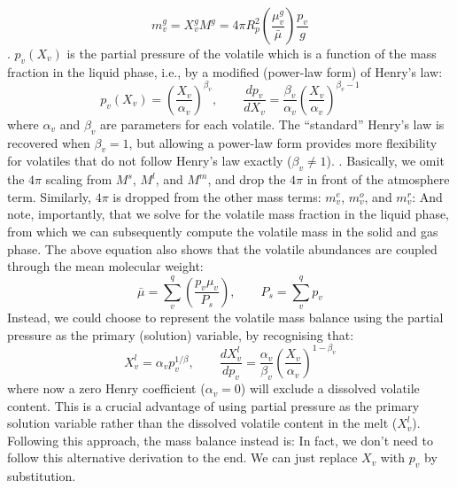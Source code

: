 \begin{equation}
m_v^g = X_v^g M^g = 4 \pi R_p^2 \left( \frac{\mu_v^g}{\bar{\mu}} \right) \frac{p_v}{g}
\end{equation}
.  $p_v(X_v)$ is the partial pressure of the volatile which is a function of the mass fraction in the liquid phase, i.e., by a modified (power-law form) of Henry's law:
\begin{equation}
p_v ( X_v ) = \left( \frac{X_v}{\alpha_v} \right)^{\beta_v}, \qquad \frac{dp_v}{d X_v} = \frac{\beta_v}{\alpha_v} \left( \frac{X_v}{\alpha_v} \right)^{\beta_v-1}
\label{eq:Henry_mod}
\end{equation}
where $\alpha_v$ and $\beta_v$ are parameters for each volatile.  The ``standard'' Henry's law is recovered when $\beta_v=1$, but allowing a power-law form provides more flexibility for volatiles that do not follow Henry's law exactly ($\beta_v \neq 1$).  .  Basically, we omit the $4 \pi$ scaling from $M^s$, $M^l$, and $M^m$, and drop the $4 \pi$ in front of the atmosphere term.  Similarly, $4 \pi$ is dropped from the other mass terms: $m_v^e$, $m_v^o$, and $m_v^r$:
And note, importantly, that we solve for the volatile mass fraction in the liquid phase, from which we can subsequently compute the volatile mass in the solid and gas phase.  The above equation also shows that the volatile abundances are coupled through the mean molecular weight:
\begin{equation}
\bar{\mu} = \sum_v^q \left( \frac{p_v \mu_v}{P_s} \right), \qquad P_s = \sum_v^q p_v
\label{eq:atmosphere_molar_mass}
\end{equation}
Instead, we could choose to represent the volatile mass balance using the partial pressure as the primary (solution) variable, by recognising that:
\begin{equation}
X_v^l = \alpha_v p_v ^{1/\beta}, \qquad \frac{dX_v^l}{d p_v} = \frac{\alpha_v}{\beta_v} \left( \frac{X_v}{\alpha_v} \right)^{1-\beta_v}
\label{eq:Henry_mod2}
\end{equation}
where now a zero Henry coefficient ($\alpha_v=0$) will exclude a dissolved volatile content.  This is a crucial advantage of using partial pressure as the primary solution variable rather than the dissolved volatile content in the melt ($X_v^l$).  Following this approach, the mass balance instead is:
In fact, we don't need to follow this alternative derivation to the end.  We can just replace $X_v$ with $p_v$ by substitution.
